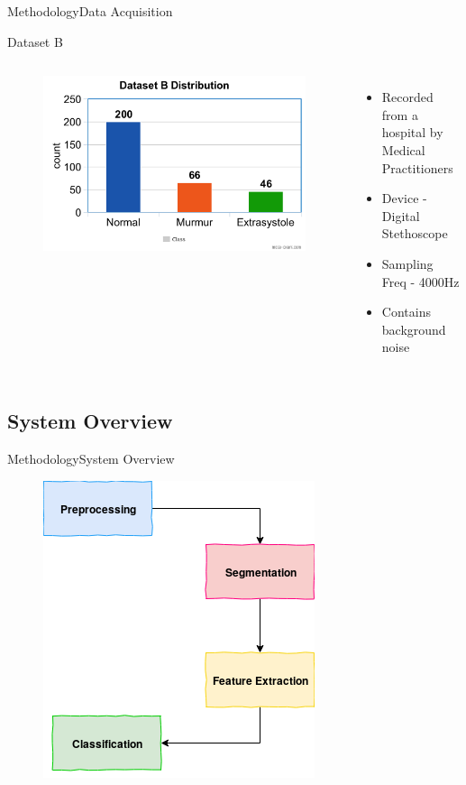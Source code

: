 \documentclass[10pt]{beamer}
\begin{document}
\begin{frame}{Methodology}{Data Acquisition}
{	\begin{block}{Dataset B}
		
		\begin{columns}
			\begin{figure}
				\centering
				\includegraphics[scale = 0.13]{AAUgraphics/db.png}
			\end{figure}
			
			\begin{itemize}
				\item Recorded from a hospital by Medical Practitioners
				\item Device - Digital Stethoscope
				\item Sampling Freq - 4000Hz
				\item Contains background noise
			\end{itemize}
			
		\end{columns}
	\end{block}  
}
\end{frame}



\subsection{System Overview}
\begin{frame}{Methodology}{System Overview}
\begin{figure}
	\centering
	\includegraphics[scale = 0.5]{AAUgraphics/presentation.png}
\end{figure}{}
\end{frame}
\end{document}
